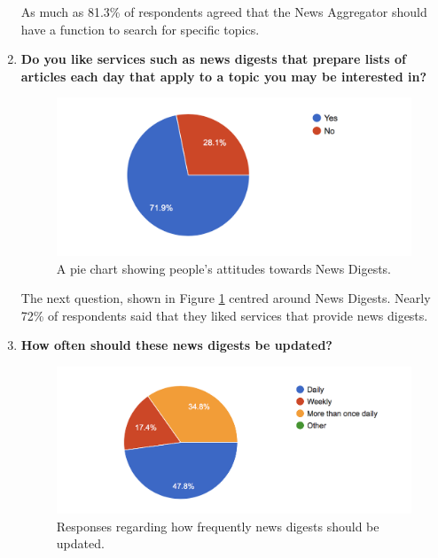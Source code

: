 \documentclass[12pt]{article}
\begin{document}
\begin{enumerate}
As much as 81.3\% of respondents agreed that the News Aggregator should have a function to search for specific topics. \\

\item \textbf{Do you like services such as news digests that prepare lists of articles each day that apply to a topic you may be interested in?}

\begin{figure}[ht!]
  \centering
    \includegraphics[scale=0.7]{12DoYouLikeServicesThatProduceDigests}
   \caption[Survey Graph about News Digests]{A pie chart showing people's attitudes towards News Digests.}
   \label{SurveyDigests}
\end{figure}

The next question, shown in Figure \ref{SurveyDigests} centred around News Digests. Nearly 72\% of respondents said that they liked services that provide news digests.\\

\item \textbf{How often should these news digests be updated?}

\begin{figure}[ht!]
  \centering
    \includegraphics[scale=0.7]{13HowOftenShouldTheseDigestsBeProduced}
   \caption[Survey Graph about News Digests' frequency]{Responses regarding how frequently news digests should be updated.}
\end{figure}


\end{enumerate}
\end{document}
